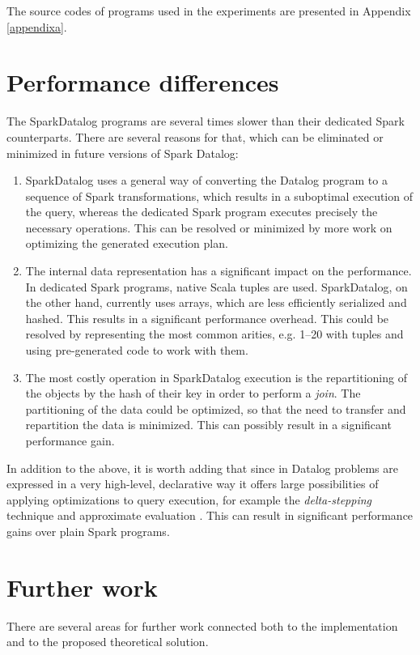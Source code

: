 The source codes of programs used in the experiments are presented in Appendix \ref{appendixa}.

\section{Performance differences}\label{s:whyslow}
The SparkDatalog programs are several times slower than their dedicated Spark counterparts. There are several reasons for that, which can be eliminated or minimized in future versions of Spark Datalog:
\begin{enumerate}
\item SparkDatalog uses a general way of converting the Datalog program to a sequence of Spark transformations, which results in a suboptimal execution of the query, whereas the dedicated Spark program executes precisely the necessary operations. This can be resolved or minimized by more work on optimizing the generated execution plan.
\item The internal data representation has a significant impact on the performance. In dedicated Spark programs, native Scala tuples are used. SparkDatalog, on the other hand, currently uses arrays, which are less efficiently serialized and hashed. This results in a significant performance overhead. This could be resolved by representing the most common arities, e.g. 1--20 with tuples and using pre-generated code to work with them.
\item The most costly operation in SparkDatalog execution is the repartitioning of the objects by the hash of their key in order to perform a \emph{join}. The partitioning of the data could be optimized, so that the need to transfer and repartition the data is minimized. This can possibly result in a significant performance gain.
\end{enumerate}

In addition to the above, it is worth adding that since in Datalog problems are expressed in a very high-level, declarative way it offers large possibilities of applying optimizations to query execution, for example the \emph{delta-stepping} technique and approximate evaluation \cite{distsoc}. This can result in significant performance gains over plain Spark programs.

\section{Further work}

There are several areas for further work connected both to the implementation and to the proposed theoretical solution.

